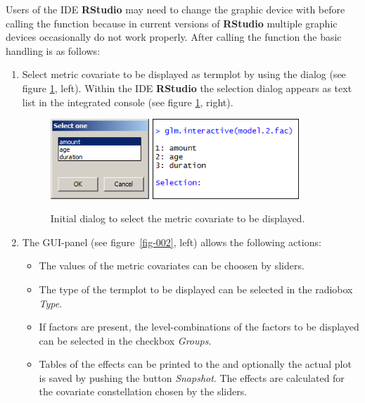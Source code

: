 \documentclass[nojss]{jss}
\begin{document}
Users of the IDE \textbf{RStudio} may need to change the graphic device with   before calling the function because in current versions of \textbf{RStudio} multiple graphic devices occasionally do not work properly. After calling the function the basic handling is as follows:
\begin{enumerate}[leftmargin=1cm, rightmargin=0.5cm, label={\arabic{enumi}.}]
\item Select metric covariate to be displayed as termplot by using the dialog (see figure \ref{fig-001}, left). Within the IDE \textbf{RStudio} the selection dialog appears as text list in the integrated console (see figure \ref{fig-001}, right). 

\begin{figure}[ht]
\centering 
\includegraphics[height=3cm, width=3.712cm]{fig-001-1}  \includegraphics[height=3cm, width=5.504cm]{fig-001-2}
\caption{Initial dialog to select the metric covariate to be displayed.}
\label{fig-001}
\end{figure}

\item The GUI-panel (see figure~\ref{fig-002}, left) allows the following actions:
\begin{itemize} [leftmargin=0.5cm, rightmargin=0.5cm, label=$\bullet$]
\item The values of the metric covariates can be choosen by sliders. 
\item The type of the termplot to be displayed can be selected in the radiobox \textit{Type}.
\item If factors are present, the level-combinations of the factors to be displayed can be selected in the checkbox \textit{Groups}.
\item Tables of the effects can be printed to the  and optionally the actual plot is saved by pushing the button \textit{Snapshot}. The effects are calculated for the covariate constellation chosen by the sliders. 
\end{itemize}


\end{enumerate}
\end{document}
